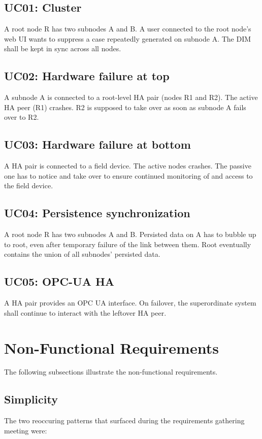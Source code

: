 \subsection{UC01: Cluster}
A root node R has two subnodes A and B. A user connected to the root node's web
UI wants to suppress a case repeatedly generated on subnode A. The DIM shall be
kept in sync across all nodes.

\subsection{UC02: Hardware failure at top}
A subnode A is connected to a root-level HA pair (nodes R1 and R2). The active
HA peer (R1) crashes. R2 is supposed to take over as soon as subnode A fails
over to R2.

\subsection{UC03: Hardware failure at bottom}
A HA pair is connected to a field device. The active nodes crashes. The passive
one has to notice and take over to ensure continued monitoring of and access to
the field device.

\subsection{UC04: Persistence synchronization}
A root node R has two subnodes A and B. Persisted data on A has to bubble up to
root, even after temporary failure of the link between them. Root eventually
contains the union of all subnodes' persisted data.

\subsection{UC05: OPC-UA HA}
A HA pair provides an OPC UA interface. On failover, the superordinate system
shall continue to interact with the leftover HA peer.

\section{Non-Functional Requirements}
The following subsections illustrate the non-functional requirements.

\subsection{Simplicity}
The two reoccuring patterns that surfaced during the requirements gathering
meeting were:

